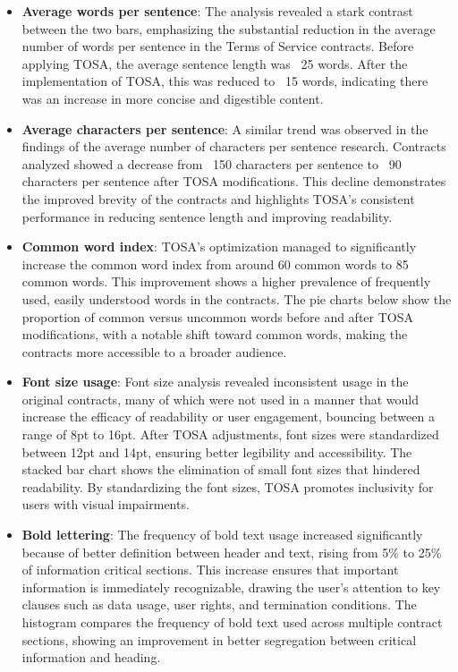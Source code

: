 \documentclass[sigconf, nonacm]{acmart}
\begin{document}
\begin{itemize}
\item \textbf{Average words per sentence}: The analysis revealed a stark contrast between the two bars, emphasizing the substantial reduction in the average number of words per sentence in the Terms of Service contracts. Before applying TOSA, the average sentence length was ~25 words. After the implementation of TOSA, this was reduced to ~15 words, indicating there was an increase in more concise and digestible content.

\item \textbf{Average characters per sentence}: A similar trend was observed in the findings of the average number of characters per sentence research. Contracts analyzed showed a decrease from ~150 characters per sentence to ~90 characters per sentence after TOSA modifications. This decline demonstrates the improved brevity of the contracts and highlights TOSA’s consistent performance in reducing sentence length and improving readability.

\item \textbf{Common word index}: TOSA’s optimization managed to significantly increase the common word index from around 60 common words to 85 common words. This improvement shows a higher prevalence of frequently used, easily understood words in the contracts. The pie charts below show the proportion of common versus uncommon words before and after TOSA modifications, with a notable shift toward common words, making the contracts more accessible to a broader audience.

\item \textbf{Font size usage}: Font size analysis revealed inconsistent usage in the original contracts, many of which were not used in a manner that would increase the efficacy of readability or user engagement, bouncing between a range of 8pt to 16pt. After TOSA adjustments, font sizes were standardized between 12pt and 14pt, ensuring better legibility and accessibility. The stacked bar chart shows the elimination of small font sizes that hindered readability. By standardizing the font sizes, TOSA promotes inclusivity for users with visual impairments.

\item \textbf{Bold lettering}: The frequency of bold text usage increased significantly because of better definition between header and text, rising from 5\% to 25\% of information critical sections. This increase ensures that important information is immediately recognizable, drawing the user's attention to key clauses such as data usage, user rights, and termination conditions. The histogram compares the frequency of bold text used across multiple contract sections, showing an improvement in better segregation between critical information and heading.


\end{itemize}
\end{document}
